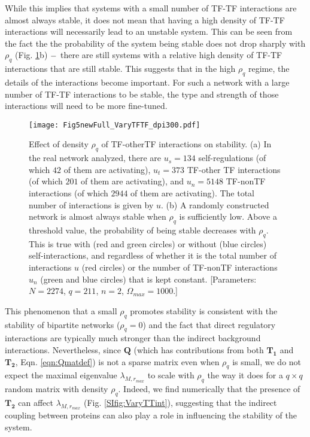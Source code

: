 \documentclass[10pt]{article}
\begin{document}
While this implies that systems with a small number of TF-TF interactions are almost always stable, it does not mean that having a high density of TF-TF interactions will necessarily lead to an unstable system. This can be seen from the fact the the probability of the system being stable does not drop sharply with $\rho_q$ (Fig. \ref{fig:VaryTTint}b) $\--$ there are still systems with a relative high density of TF-TF interactions that are still stable. This suggests that in the high $\rho_q$ regime, the details of the interactions become important. For such a network with a large number of TF-TF interactions to be stable, the type and strength of those interactions will need to be more fine-tuned. 

\begin{figure}[tp]
    \centering
	\texttt{[image: Fig5newFull\_VaryTFTF\_dpi300.pdf]}
    \caption{Effect of density $\rho_q$ of TF-otherTF interactions on stability. (a) In the real network analyzed, there are $u_s = 134$ self-regulations (of which $42$ of them are activating), $u_t = 373$ TF-other TF interactions (of which $201$ of them are activating), and $u_n = 5148$ TF-nonTF interactions (of which $2944$ of them are activating). The total number of interactions is given by $u$. (b) A randomly constructed network is almost always stable when $\rho_q$ is sufficiently low. Above a threshold value, the probability of being stable decreases with $\rho_q$. This is true with (red and green circles) or without (blue circles) self-interactions, and regardless of whether it is the total number of interactions $u$ (red circles) or the number of TF-nonTF interactions $u_n$ (green and blue circles) that is kept constant. [Parameters: $N = 2274$, $q = 211$, $n=2$, $\Omega_{max} = 1000$.]}
    \label{fig:VaryTTint}
\end{figure}

This phenomenon that a small $\rho_q$ promotes stability is consistent with the stability of bipartite networks ($\rho_q = 0$) and the fact that direct regulatory interactions are typically much stronger than the indirect background interactions. Nevertheless, since $\mathbf{Q}$ (which has contributions from both $\mathbf{T_1}$ and $\mathbf{T_2}$, Eqn. \ref{eqn:Qmatdef}) is not a sparse matrix even when $\rho_q$ is small, we do not expect the maximal eigenvalue $\lambda_{M,r_{max}}$ to scale with $\rho_q$ the way it does for a $q \times q$ random matrix with density $\rho_q$. Indeed, we find numerically that the presence of $\mathbf{T_2}$ can affect $\lambda_{M,r_{max}}$ (Fig. \ref{SIfig:VaryTTint}), suggesting that the indirect coupling between proteins can also play a role in influencing the stability of the system. 
\end{document}
